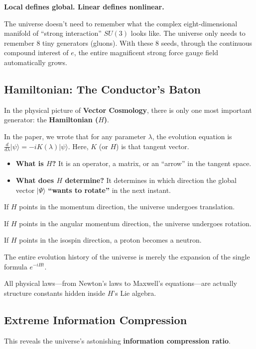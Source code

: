 \documentclass[11pt,a4paper,twoside]{book}
\begin{document}
\textbf{Local defines global. Linear defines nonlinear.}

The universe doesn't need to remember what the complex eight-dimensional manifold of ``strong interaction'' $SU(3)$ looks like. The universe only needs to remember 8 tiny generators (gluons). With these 8 seeds, through the continuous compound interest of $e$, the entire magnificent strong force gauge field automatically grows.

\subsection{Hamiltonian: The Conductor's Baton}

In the physical picture of \textbf{Vector Cosmology}, there is only one most important generator: the \textbf{Hamiltonian ($H$)}.

In the paper, we wrote that for any parameter $\lambda$, the evolution equation is $\frac{d}{d\lambda}|\psi\rangle = -iK(\lambda)|\psi\rangle$. Here, $K$ (or $H$) is that tangent vector.

\begin{itemize}
\item \textbf{What is $H$?} It is an operator, a matrix, or an ``arrow'' in the tangent space.

\item \textbf{What does $H$ determine?} It determines in which direction the global vector $|\Psi\rangle$ \textbf{``wants to rotate''} in the next instant.
\end{itemize}

If $H$ points in the momentum direction, the universe undergoes translation.

If $H$ points in the angular momentum direction, the universe undergoes rotation.

If $H$ points in the isospin direction, a proton becomes a neutron.

The entire evolution history of the universe is merely the expansion of the single formula \textbf{$e^{-iHt}$}.

All physical laws---from Newton's laws to Maxwell's equations---are actually structure constants hidden inside $H$'s Lie algebra.

\subsection{Extreme Information Compression}

This reveals the universe's astonishing \textbf{information compression ratio}.
\end{document}
